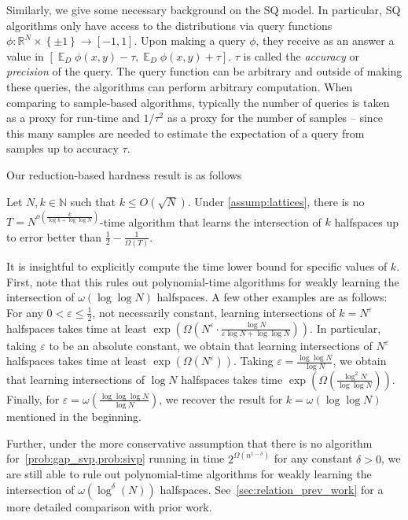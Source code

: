 \documentclass{theoretics}
\newcommand{\Set}[1]{\left\{#1\right\}}
\newcommand{\Esymb}{\mathbb{E}}
\DeclareMathOperator*{\E}{\Esymb}
\newcommand{\N}{\mathbb N}
\newcommand{\R}{\mathbb R}
\renewcommand{\leq}{\leqslant}
\let\epsilon=\varepsilon
\newcommand{\e}{\epsilon}
\begin{document}
Similarly, we give some necessary background on the SQ model.
In particular, SQ algorithms only have access to the distributions via query functions $\phi \colon \R^N\times \Set{\pm 1} \rightarrow [-1,1]$.
Upon making a query $\phi$, they receive as an answer a value in $[\E_D \phi(x,y) - \tau,\E_D \phi(x,y) + \tau]$.
$\tau$ is called the \emph{accuracy} or \emph{precision} of the query.
The query function can be arbitrary and outside of making these queries, the algorithms can perform arbitrary computation.
When comparing to sample-based algorithms, typically the number of queries is taken as a proxy for run-time and $1/\tau^2$ as a proxy for the number of samples -- since this many samples are needed to estimate the expectation of a query from samples up to accuracy $\tau$.

Our reduction-based hardness result is as follows
\begin{theorem}
    \label{thm:crypto_intro}
    Let $N, k \in \N$ such that $k \leq O(\sqrt{N})$.
    Under \cref{assump:lattices}, there is no $T = N^{o(\tfrac{k}{\log k + \log\log N})}$-time algorithm that learns the intersection of $k$ halfspaces up to error better than $\tfrac 1 2 - \tfrac 1 {\Omega(T)}$.
\end{theorem}
It is insightful to explicitly compute the time lower bound for specific values of $k$.
First, note that this rules out polynomial-time algorithms for weakly learning the intersection of $\omega(\log \log N)$ halfspaces.
A few other examples are as follows:
For any $0 < \e \leq \tfrac 1 2$, not necessarily constant, learning intersections of $k = N^\e$ halfspaces takes time at least $\exp(\Omega(N^\e \cdot \tfrac{\log N}{\e \log N + \log\log N}))$.
In particular, taking $\e$ to be an absolute constant, we obtain that learning intersections of $N^\e$ halfspaces takes time at least $\exp(\Omega(N^\e))$.
Taking $\e = \tfrac{\log\log N}{\log N}$, we obtain that learning intersections of $\log N$ halfspaces takes time $\exp(\Omega(\tfrac{\log^2 N}{\log \log N}))$.
Finally, for $\e = \omega(\tfrac{\log\log\log N}{\log N})$, we recover the result for $k = \omega(\log \log N)$ mentioned in the beginning.

Further, under the more conservative assumption that there is no algorithm for~\cref{prob:gap_svp,prob:sivp} running in time $2^{\Omega(n^{1-\delta})}$ for any constant $\delta > 0$, we are still able to rule out polynomial-time algorithms for weakly learning the intersection of $\omega(\log^\delta (N))$ halfspaces.
See~\cref{sec:relation_prev_work} for a more detailed comparison with prior work.
\end{document}

